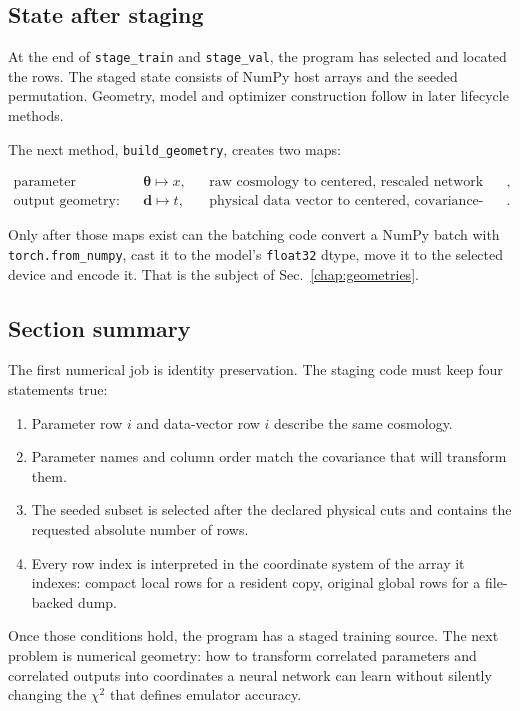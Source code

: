 \documentclass[10pt,aps,prd,twocolumn,nofootinbib]{revtex4-2}
\newcommand{\code}[1]{\texttt{#1}}
\newcommand{\btheta}{\boldsymbol{\theta}}
\newcommand{\bd}{\mathbf{d}}
\begin{document}
\subsection{State after staging}

At the end of \code{stage\_train} and \code{stage\_val}, the program has
selected and located the rows.  The staged state consists of NumPy host arrays
and the seeded permutation.  Geometry, model and optimizer construction follow
in later lifecycle methods.

The next method, \code{build\_geometry}, creates two maps:
\begin{widetext}
\begin{align*}
  \text{parameter geometry: }&
  \btheta\longmapsto x,
  &&\text{raw cosmology to centered, rescaled network input},\\
  \text{output geometry: }&
  \bd\longmapsto t,
  &&\text{physical data vector to centered, covariance-scaled target}.
\end{align*}
\end{widetext}
Only after those maps exist can the batching code convert a NumPy batch with
\code{torch.from\_numpy}, cast it to the model's \code{float32} dtype, move it
to the selected device and encode it.  That is the subject of
Sec.~\ref{chap:geometries}.

\subsection{Section summary}

The first numerical job is identity preservation.  The staging code must keep
four statements true:
\begin{enumerate}
  \item Parameter row $i$ and data-vector row $i$ describe the same
        cosmology.
  \item Parameter names and column order match the covariance that will
        transform them.
  \item The seeded subset is selected after the declared physical cuts and
        contains the requested absolute number of rows.
  \item Every row index is interpreted in the coordinate system of the array
        it indexes: compact local rows for a resident copy, original global
        rows for a file-backed dump.
\end{enumerate}
Once those conditions hold, the program has a staged training source.  The
next problem is numerical geometry: how to transform correlated parameters
and correlated outputs into coordinates a neural network can learn without
silently changing the $\chi^2$ that defines emulator accuracy.
\end{document}
